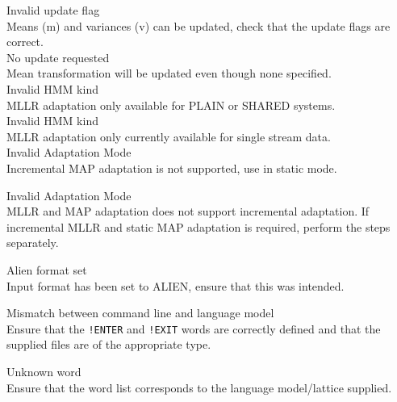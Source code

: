 \begin{itemize}

\begin{itemize}

 Invalid update flag\\      
        Means (m) and variances (v) can be updated, check that the update 
        flags are correct.\\

 No update requested\\
        Mean transformation will be updated even though none specified.\\

 Invalid HMM kind\\
        MLLR adaptation only available for PLAIN or SHARED systems.\\

 Invalid HMM kind\\
        MLLR adaptation only currently available for single stream data.\\

 Invalid Adaptation Mode\\
        Incremental MAP adaptation is not supported, use in static
        mode.

 Invalid Adaptation Mode\\
        MLLR and MAP adaptation does not support incremental
        adaptation. If incremental MLLR and static MAP adaptation is 
        required, perform the steps separately.

 Alien format set\\
        Input format has been set to ALIEN, ensure that this was intended.\\

\end{itemize}


\begin{itemize}
 Mismatch between command line and language model\\
        Ensure that the \texttt{!ENTER} and \texttt{!EXIT} words are correctly 
        defined and that the supplied files are of the appropriate type.

 Unknown word\\
        Ensure that the word list corresponds to the language model/lattice
        supplied.

\end{itemize}


\end{itemize}
